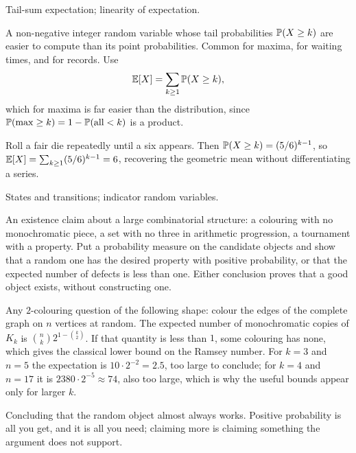 \begin{seealsob}Tail-sum expectation; linearity of expectation.\end{seealsob}

\cue A non-negative integer random variable whose tail probabilities $\mathbb{P}(X\geq k)$ are easier to compute than its point probabilities. Common for maxima, for waiting times, and for records.
\method Use
\[
\mathbb{E}[X]=\sum_{k\geq1}\mathbb{P}(X\geq k),
\]
which for maxima is far easier than the distribution, since $\mathbb{P}(\max\geq k)=1-\mathbb{P}(\text{all}<k)$ is a product.

\begin{worked}
Roll a fair die repeatedly until a six appears. Then $\mathbb{P}(X\geq k)=(5/6)^{k-1}$, so $\mathbb{E}[X]=\sum_{k\geq1}(5/6)^{k-1}=6$, recovering the geometric mean without differentiating a series.
\end{worked}

\begin{seealsob}States and transitions; indicator random variables.\end{seealsob}

\cue An existence claim about a large combinatorial structure: a colouring with no monochromatic piece, a set with no three in arithmetic progression, a tournament with a property.
\method Put a probability measure on the candidate objects and show that a random one has the desired property with positive probability, or that the expected number of defects is less than one. Either conclusion proves that a good object exists, without constructing one.

\begin{worked}
Any $2$-colouring question of the following shape: colour the edges of the complete graph on $n$ vertices at random. The expected number of monochromatic copies of $K_{k}$ is $\binom{n}{k}2^{1-\binom{k}{2}}$. If that quantity is less than $1$, some colouring has none, which gives the classical lower bound on the Ramsey number. For $k=3$ and $n=5$ the expectation is $10\cdot2^{-2}=2.5$, too large to conclude; for $k=4$ and $n=17$ it is $2380\cdot2^{-5}\approx74$, also too large, which is why the useful bounds appear only for larger $k$.
\end{worked}

\begin{trap}
Concluding that the random object almost always works. Positive probability is all you get, and it is all you need; claiming more is claiming something the argument does not support.
\end{trap}

